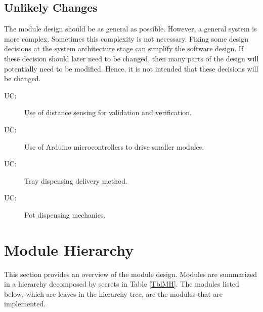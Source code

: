 \documentclass[12pt, titlepage]{article}
\newcounter{ucnum}
\newcommand{\uctheucnum}{UC\theucnum}
\begin{document}
\subsection{Unlikely Changes} \label{SecUchange}

The module design should be as general as possible. However, a general system is
more complex. Sometimes this complexity is not necessary. Fixing some design
decisions at the system architecture stage can simplify the software design. If
these decision should later need to be changed, then many parts of the design
will potentially need to be modified. Hence, it is not intended that these
decisions will be changed.

\begin{description}
\item[ \uctheucnum \label{ucIO}:] Use of distance sensing for
validation and verification.
\item[ \uctheucnum \label{ucIO}:] Use of Arduino microcontrollers to drive 
smaller modules.
\item[ \uctheucnum \label{ucIO}:] Tray dispensing delivery method.
\item[ \uctheucnum \label{ucIO}:] Pot dispensing mechanics. 
\end{description}

\newpage


\section{Module Hierarchy} \label{SecMH}

This section provides an overview of the module design. Modules are summarized
in a hierarchy decomposed by secrets in Table \ref{TblMH}. The modules listed
below, which are leaves in the hierarchy tree, are the modules that are implemented.
\end{document}
